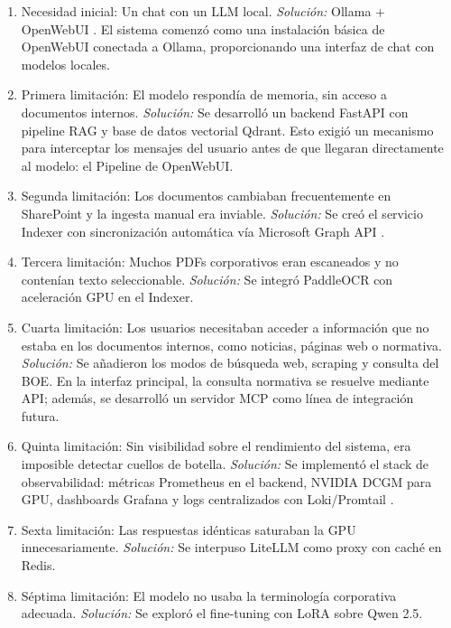 \begin{enumerate}
    \item Necesidad inicial: Un chat con un LLM local. \textit{Solución:} Ollama + OpenWebUI \cite{ollama2024docs,openwebui2024docs}. El sistema comenzó como una instalación básica de OpenWebUI conectada a Ollama, proporcionando una interfaz de chat con modelos locales.

    \item Primera limitación: El modelo respondía de memoria, sin acceso a documentos internos. \textit{Solución:} Se desarrolló un backend FastAPI con pipeline RAG y base de datos vectorial Qdrant. Esto exigió un mecanismo para interceptar los mensajes del usuario antes de que llegaran directamente al modelo: el Pipeline de OpenWebUI.

    \item Segunda limitación: Los documentos cambiaban frecuentemente en SharePoint y la ingesta manual era inviable. \textit{Solución:} Se creó el servicio Indexer con sincronización automática vía Microsoft Graph API \cite{msgraph2024docs}.

    \item Tercera limitación: Muchos PDFs corporativos eran escaneados y no contenían texto seleccionable. \textit{Solución:} Se integró PaddleOCR con aceleración GPU en el Indexer.

    \item Cuarta limitación: Los usuarios necesitaban acceder a información que no estaba en los documentos internos, como noticias, páginas web o normativa. \textit{Solución:} Se añadieron los modos de búsqueda web, scraping y consulta del BOE. En la interfaz principal, la consulta normativa se resuelve mediante API; además, se desarrolló un servidor MCP como línea de integración futura.

    \item Quinta limitación: Sin visibilidad sobre el rendimiento del sistema, era imposible detectar cuellos de botella. \textit{Solución:} Se implementó el stack de observabilidad: métricas Prometheus en el backend, NVIDIA DCGM para GPU, dashboards Grafana y logs centralizados con Loki/Promtail \cite{prometheus2026docs,dcgmExporter2026docs,grafana2026docs}.

    \item Sexta limitación: Las respuestas idénticas saturaban la GPU innecesariamente. \textit{Solución:} Se interpuso LiteLLM como proxy con caché en Redis.

    \item Séptima limitación: El modelo no usaba la terminología corporativa adecuada. \textit{Solución:} Se exploró el fine-tuning con LoRA sobre Qwen 2.5.


\end{enumerate}
